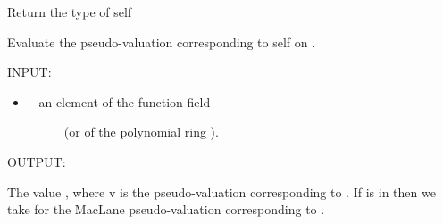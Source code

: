 \documentclass[letterpaper,10pt,english]{sphinxmanual}
\begin{document}
\begin{fulllineitems}

\begin{fulllineitems}
\label{berkovich_line:mclf.berkovich.berkovich_line.TypeIPointOnBerkovichLine.type}
Return the type of self

\end{fulllineitems}


\begin{fulllineitems}
\label{berkovich_line:mclf.berkovich.berkovich_line.TypeIPointOnBerkovichLine.v}
Evaluate the pseudo-valuation corresponding to self on .

INPUT:
\begin{itemize}
\item {} \begin{description}
\item[{ -- an element of the function field }] \leavevmode
(or of the polynomial ring ).

\end{description}

\end{itemize}

OUTPUT:

The value , where v is the pseudo-valuation corresponding to .
If  is in  then we take for  the MacLane pseudo-valuation
corresponding to .

\end{fulllineitems}


\end{fulllineitems}

\end{document}
